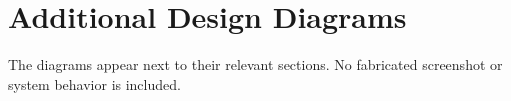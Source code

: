 \chapter{Additional Design Diagrams}
The diagrams appear next to their relevant sections. No fabricated screenshot or system behavior is included.
